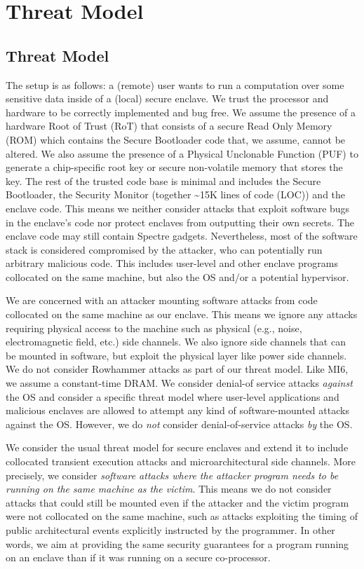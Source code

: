 \section{Threat Model}

\subsection{Threat Model}
\label{sec:threadmodel}

The setup is as follows:
a (remote)
user wants to run a computation over some sensitive data inside of a (local) secure enclave.
We trust the processor and hardware to be correctly implemented and bug free.
We assume the presence of a hardware Root of Trust (RoT) that consists of a secure Read Only Memory (ROM) which contains the Secure Bootloader code that, we assume, cannot be altered.
We also assume the presence of a Physical Unclonable Function (PUF) \cite{herder2014physical} to generate a chip-specific root key or secure non-volatile memory that stores the key.
The rest of the trusted code base is minimal and includes the Secure Bootloader, the Security Monitor (together \textasciitilde15K lines of code (LOC)) and the enclave code.
This means we neither consider attacks that exploit software bugs in the enclave's code nor protect enclaves from outputting their own secrets.
The enclave code may still contain Spectre gadgets.
Nevertheless, most of the software stack is considered compromised by the attacker, who can potentially run arbitrary malicious code.
This includes user-level and other enclave programs collocated on the same machine, but also the OS and/or a potential hypervisor.

We are concerned with an attacker mounting software attacks from code collocated on the same machine as our enclave.
This means we ignore any attacks requiring physical access to the machine such as physical (e.g., noise, electromagnetic field, etc.) side channels. 
We also ignore side channels that can be mounted in software, but exploit the physical layer like power side channels.
We do not consider Rowhammer attacks as part of our threat model.
Like MI6, we assume a constant-time DRAM.
We consider denial-of service attacks \textit{against} the OS and consider a specific threat model where user-level applications and malicious enclaves are allowed to attempt any kind of software-mounted attacks against the OS. However, we do \textit{not} consider denial-of-service attacks \textit{by} the OS.

We consider the usual threat model for secure enclaves and extend it to include collocated transient execution attacks and microarchitectural side channels.
More precisely, we consider \emph{software attacks where the attacker program needs to be running on the same machine as the victim}. 
This means we do not consider attacks that could still be mounted even if the attacker and the victim program were not collocated on the same machine, such as attacks exploiting the timing of public architectural events explicitly instructed by the programmer.
In other words, we aim at providing the same security guarantees for a program running on an enclave than if it was running on a secure co-processor.

